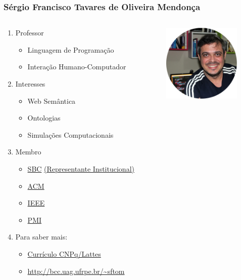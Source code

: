 \documentclass[presentation]{beamer}
\begin{document}
\begin{frame}
   \frametitle{Sérgio Francisco Tavares de Oliveira Mendonça}
      \begin{columns}
         \begin{column}{0.68\textwidth}
            \begin{enumerate}
            \item Professor
            \begin{itemize}
            \item Linguagem de Programação
            \item Interação Humano-Computador
            \end{itemize}
            \item Interesses
            \begin{itemize}
            \item Web Semântica
            \item Ontologias
            \item Simulações Computacionais
            \end{itemize}
            \item Membro
            \begin{itemize}
            \item \href{http://www.sbc.org.br}{SBC} \href{http://bit.ly/w2zY3N}{(Representante Institucional)}
            \item \href{http://www.acm.org}{ACM}
            \item \href{http://www.ieee.org}{IEEE}
            \item \href{http://www.pmi.org}{PMI}
            \end{itemize}
            \item Para saber mais:
            \begin{itemize}
            \item \href{http://lattes.cnpq.br/6313698968060384}{Currículo CNPq/Lattes}
            \item \href{http://bcc.uag.ufrpe.br/\~sftom}{http://bcc.uag.ufrpe.br/\textasciitilde sftom}
            \end{itemize}
            \end{enumerate}
         \end{column}

         \begin{column}{0.32\textwidth}
            \includegraphics[width=10em]{img/sftom-640x640-circular.jpg}
         \end{column}
      \end{columns}
\end{frame}
\end{document}
